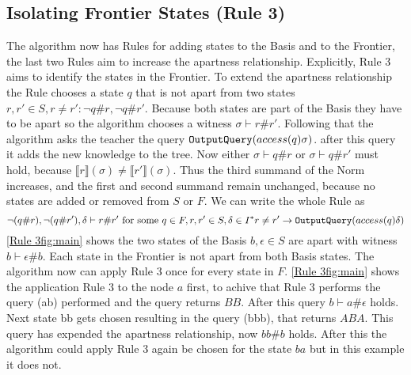 \subsection{Isolating Frontier States (Rule 3)}
The algorithm now has Rules for adding states to the Basis and to the Frontier, the last two Rules aim to increase the apartness relationship. Explicitly, Rule 3 aims to identify the states in the Frontier. To extend the apartness relationship the Rule chooses a state $q$ that is not apart from two states $r,r'\in S, r\neq r':\neg q\#r,\neg q\#r'$. Because both states are part of the Basis they have to be apart so the algorithm chooses a witness $\sigma\vdash r\#r'$. Following that the algorithm asks the teacher the query $\textnormal{\texttt{OutputQuery}}(access(q)\sigma)$. after this query it adds the new knowledge to the tree. Now either $\sigma\vdash q\#r$ or $\sigma\vdash q\#r'$ must hold, because $\llbracket r\rrbracket(\sigma)\neq\llbracket r' \rrbracket (\sigma)$. Thus the third summand of the Norm increases, and the first and second summand remain unchanged, because no states are added or removed from $S$ or $F$. We can write the whole Rule as $$
\neg (q\#r),\neg(q\#r'),\delta\vdash r\#r' \text{ for some } q\in F, r,r'\in S, \delta\in I^* r\neq r' \rightarrow \textnormal{\texttt{OutputQuery}}(access(q) \delta)
$$
\autoref{Rule 3fig:main} shows the two states of the Basis $b,\epsilon\in S$ are apart with witness $b\vdash\epsilon\#b$. Each state in the Frontier is not apart from both Basis states. The algorithm now can apply Rule 3 once for every state in $F$. \autoref{Rule 3fig:main} shows the application Rule 3 to the node $a$ first, to achive that Rule 3 performs the query \oquery(ab) performed and the query returns $BB$. After this query $b\vdash a\#\epsilon$ holds. Next state bb gets chosen resulting in the query \oquery(bbb), that returns $ABA$. This query has expended the apartness relationship, now $bb\#b$ holds. After this the algorithm could apply Rule 3 again be chosen for the state $ba$ but in this example it does not. 
